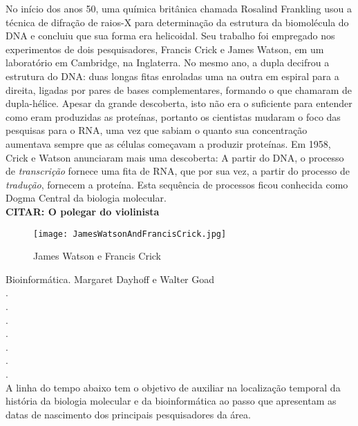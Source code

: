 \indent No início dos anos 50, uma química britânica chamada Rosalind Frankling usou a técnica de difração de raios-X para determinação da estrutura da biomolécula do DNA e concluiu que sua forma era helicoidal. Seu trabalho foi empregado nos experimentos de dois pesquisadores, Francis Crick e James Watson, em um laboratório em Cambridge, na Inglaterra. No mesmo ano, a dupla decifrou a estrutura do DNA: duas longas fitas enroladas uma na outra em espiral para a direita, ligadas por pares de bases complementares, formando o que chamaram de dupla-hélice. Apesar da grande descoberta, isto não era o suficiente para entender como eram produzidas as proteínas, portanto os cientistas mudaram o foco das pesquisas para o RNA, uma vez que sabiam o quanto sua concentração aumentava sempre que as células começavam a produzir proteínas. Em 1958, Crick e Watson anunciaram mais uma descoberta: A partir do DNA, o processo de \textit{transcrição} fornece uma fita de RNA, que por sua vez, a partir do processo de \textit{tradução}, fornecem a proteína. Esta sequência de processos ficou conhecida como Dogma Central da biologia molecular. \\

\textbf{CITAR: O polegar do violinista}

\vspace{1cm}
 \begin{figure}[h!]
     \centering
     \texttt{[image: JamesWatsonAndFrancisCrick.jpg]}
     \caption{James Watson e Francis Crick}
     \label{fig:JamesWatsonAndFrancisCrick}
 \end{figure}
\vspace{1cm}

\indent Bioinformática. Margaret Dayhoff e Walter Goad \\.\\.\\.\\.\\.\\.\\.\\


\indent A linha do tempo abaixo tem o objetivo de auxiliar na localização temporal da história da biologia molecular e da bioinformática ao passo que apresentam as datas de nascimento dos principais pesquisadores da área.

